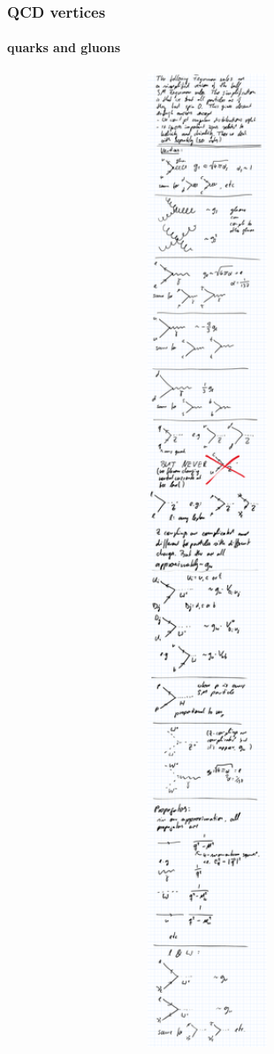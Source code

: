 \subsubsection{QCD vertices}
\paragraph{quarks and gluons\\}
\includegraphics[width=0.9\textwidth]{fig/summary/F_qg}

